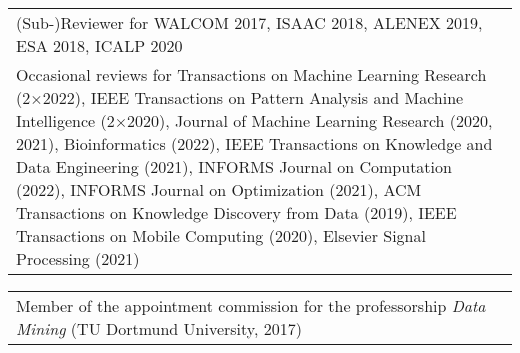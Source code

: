 \documentclass[11pt, a4paper, DIV=12]{scrartcl}
\begin{document}
\begin{tabular}{p{14.5cm}}
	(Sub-)Reviewer for WALCOM 2017, ISAAC 2018, ALENEX 2019, ESA 2018, ICALP 2020                                                                                                                                                                                                                                                                                                                                                                                                                                                                                                                                                                                                                                                                                                                                                                                                                            \\[0.2em]

	Occasional reviews for Transactions on Machine Learning Research (2$\times$2022), IEEE Transactions on Pattern Analysis and Machine Intelligence (2$\times$2020), Journal of Machine Learning Research (2020, 2021), Bioinformatics (2022), IEEE Transactions on Knowledge and Data Engineering (2021), INFORMS Journal on Computation (2022), INFORMS Journal on Optimization (2021), ACM Transactions on Knowledge Discovery from Data (2019), IEEE Transactions on Mobile Computing (2020), Elsevier Signal Processing (2021)                                                                                                                                                                                                                                                                                                                                                                         \\
\end{tabular}

\begin{tabular}{p{14.5cm}}
	Member of the appointment commission for the professorship \emph{Data Mining} (TU Dortmund University, 2017)
\end{tabular}
\end{document}
